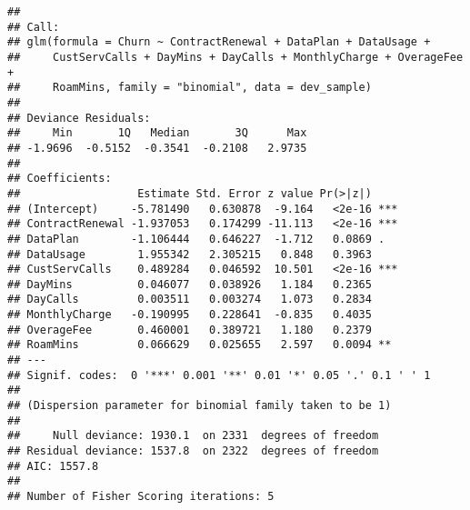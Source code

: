 \documentclass[]{article}
\newenvironment{Shaded}{\begin{snugshade}}{\end{snugshade}}
\newcommand{\KeywordTok}[1]{\textcolor[rgb]{0.13,0.29,0.53}{\textbf{#1}}}
\newcommand{\DataTypeTok}[1]{\textcolor[rgb]{0.13,0.29,0.53}{#1}}
\newcommand{\StringTok}[1]{\textcolor[rgb]{0.31,0.60,0.02}{#1}}
\newcommand{\CommentTok}[1]{\textcolor[rgb]{0.56,0.35,0.01}{\textit{#1}}}
\newcommand{\OperatorTok}[1]{\textcolor[rgb]{0.81,0.36,0.00}{\textbf{#1}}}
\newcommand{\NormalTok}[1]{#1}
\begin{document}
\begin{Shaded}
\end{Shaded}

\begin{verbatim}
## 
## Call:
## glm(formula = Churn ~ ContractRenewal + DataPlan + DataUsage + 
##     CustServCalls + DayMins + DayCalls + MonthlyCharge + OverageFee + 
##     RoamMins, family = "binomial", data = dev_sample)
## 
## Deviance Residuals: 
##     Min       1Q   Median       3Q      Max  
## -1.9696  -0.5152  -0.3541  -0.2108   2.9735  
## 
## Coefficients:
##                  Estimate Std. Error z value Pr(>|z|)    
## (Intercept)     -5.781490   0.630878  -9.164   <2e-16 ***
## ContractRenewal -1.937053   0.174299 -11.113   <2e-16 ***
## DataPlan        -1.106444   0.646227  -1.712   0.0869 .  
## DataUsage        1.955342   2.305215   0.848   0.3963    
## CustServCalls    0.489284   0.046592  10.501   <2e-16 ***
## DayMins          0.046077   0.038926   1.184   0.2365    
## DayCalls         0.003511   0.003274   1.073   0.2834    
## MonthlyCharge   -0.190995   0.228641  -0.835   0.4035    
## OverageFee       0.460001   0.389721   1.180   0.2379    
## RoamMins         0.066629   0.025655   2.597   0.0094 ** 
## ---
## Signif. codes:  0 '***' 0.001 '**' 0.01 '*' 0.05 '.' 0.1 ' ' 1
## 
## (Dispersion parameter for binomial family taken to be 1)
## 
##     Null deviance: 1930.1  on 2331  degrees of freedom
## Residual deviance: 1537.8  on 2322  degrees of freedom
## AIC: 1557.8
## 
## Number of Fisher Scoring iterations: 5
\end{verbatim}
\end{document}
